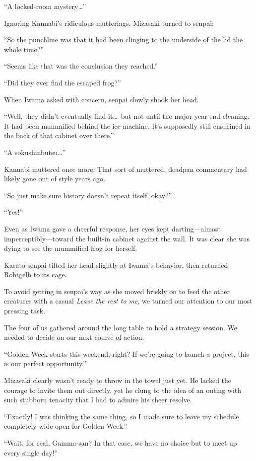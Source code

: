\documentclass[
    a4paper,
    12pt,
    twoside,
    openany,
    UTF8,
    fontset=windows
]{ctexbook}
\begin{document}
``A locked-room mystery\dots''

Ignoring Kannabi's ridiculous mutterings, Mizasaki turned to senpai:

``So the punchline was that it had been clinging to the underside of the lid the whole time?''

``Seems like that was the conclusion they reached.''

``Did they ever find the escaped frog?''

When Iwama asked with concern, senpai slowly shook her head.

``Well, they didn't eventually find it\dots\ but not until the major year-end cleaning. It had been mummified behind the ice machine. It's supposedly still enshrined in the back of that cabinet over there.''

``A sokushinbutsu\dots''

Kannabi muttered once more. That sort of muttered, deadpan commentary had likely gone out of style years ago.

``So just make sure history doesn't repeat itself, okay?''

``Yes!''

Even as Iwama gave a cheerful response, her eyes kept darting---almost imperceptibly---toward the built-in cabinet against the wall. It was clear she was dying to see the mummified frog for herself.

Karato-senpai tilted her head slightly at Iwama's behavior, then returned Rohtgelb to its cage.

To avoid getting in senpai's way as she moved briskly on to feed the other creatures with a casual \textit{Leave the rest to me}, we turned our attention to our most pressing task.

The four of us gathered around the long table to hold a strategy session. We needed to decide on our next course of action.

``Golden Week starts this weekend, right? If we're going to launch a project, this is our perfect opportunity.''

Mizasaki clearly wasn't ready to throw in the towel just yet. He lacked the courage to invite them out directly, yet he clung to the idea of an outing with such stubborn tenacity that I had to admire his sheer resolve.

``Exactly! I was thinking the same thing, so I made sure to leave my schedule completely wide open for Golden Week.''

``Wait, for real, Gamma-san? In that case, we have no choice but to meet up every single day!''
\end{document}
